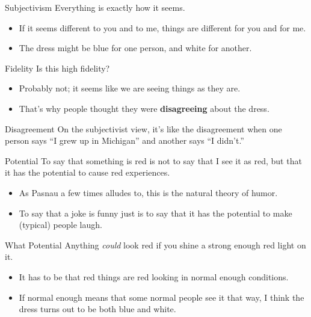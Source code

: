 \documentclass[
  17pt,
  letterpaper,
  ignorenonframetext,
  aspectratio=169,
]{beamer}
\providecommand{\tightlist}{%
  \setlength{\itemsep}{0pt}\setlength{\parskip}{0pt}}\usepackage{longtable,booktabs,array}
\begin{document}
\begin{frame}{Subjectivism}
\protect\hypertarget{subjectivism}{}
Everything is exactly how it seems.

\begin{itemize}[<+->]
\tightlist
\item
  If it seems different to you and to me, things are different for you
  and for me.
\item
  The dress might be blue for one person, and white for another.
\end{itemize}
\end{frame}

\begin{frame}{Fidelity}
\protect\hypertarget{fidelity}{}
Is this high fidelity?

\begin{itemize}[<+->]
\tightlist
\item
  Probably not; it seems like we are seeing things as they are.
\item
  That's why people thought they were \textbf{disagreeing} about the
  dress.
\end{itemize}
\end{frame}

\begin{frame}{Disagreement}
\protect\hypertarget{disagreement}{}
On the subjectivist view, it's like the disagreement when one person
says ``I grew up in Michigan'' and another says ``I didn't.''
\end{frame}

\begin{frame}{Potential}
\protect\hypertarget{potential}{}
To say that something is red is not to say that I see it as red, but
that it has the potential to cause red experiences.

\begin{itemize}[<+->]
\tightlist
\item
  As Pasnau a few times alludes to, this is the natural theory of humor.
\item
  To say that a joke is funny just is to say that it has the potential
  to make (typical) people laugh.
\end{itemize}
\end{frame}

\begin{frame}{What Potential}
\protect\hypertarget{what-potential}{}
Anything \emph{could} look red if you shine a strong enough red light on
it.

\begin{itemize}[<+->]
\tightlist
\item
  It has to be that red things are red looking in normal enough
  conditions.
\item
  If normal enough means that some normal people see it that way, I
  think the dress turns out to be both blue and white.
\end{itemize}
\end{frame}
\end{document}
